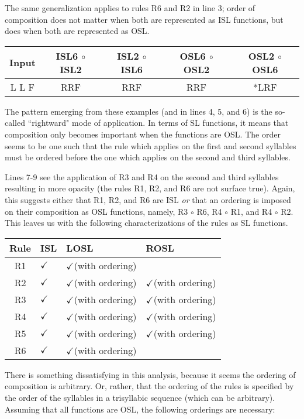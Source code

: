 \documentclass{article}
\newcommand{\Y}{$\checkmark$}
\newcommand{\N}{\ding{55}}
\begin{document}
 \par
The same generalization applies to rules R6 and R2 in line 3; order of composition does not matter when both are represented as ISL functions, but does when both are represented as OSL. 
\begin{exe}
\ex
\begin{tabular}[t]{|c|c|c||c|c|}
\hline
Input & ISL6 $\circ$ ISL2 & ISL2 $\circ$ ISL6 & OSL6 $\circ$ OSL2 & OSL2 $\circ$ OSL6  \\
\hline
L L F & RRF & RRF & RRF & *LRF   \\ 
\hline
\end{tabular}
\end{exe}
The pattern emerging from these examples (and in lines 4, 5, and 6) is the so-called ``rightward" mode of application. In terms of SL functions, it means that composition only becomes important when the functions are OSL. The order seems to be one such that the rule which applies on the first and second syllables must be ordered before the one which applies on the second and third syllables.
\par
Lines 7-9 see the application of R3 and R4 on the second and third syllables resulting in more opacity (the rules R1, R2, and R6 are not surface true). Again, this suggests either that R1, R2, and R6 are ISL \emph{or} that an ordering is imposed on their composition as OSL functions, namely, R3 $\circ$ R6, R4 $\circ$ R1, and R4 $\circ$ R2. This leaves us with the following characterizations of the rules as SL functions.
\begin{exe}
\ex
\begin{tabular}[t]{|c|l|l|l|}
\hline
Rule & ISL & LOSL & ROSL \\
\hline
R1 & \Y & \Y (with ordering) & \N \\
\hline
R2 & \Y & \Y (with ordering) & \Y (with ordering) \\
\hline
R3 & \Y & \Y (with ordering) & \Y (with ordering) \\
\hline
R4 & \Y & \Y (with ordering) & \Y (with ordering) \\
\hline
R5 & \Y & \Y (with ordering) & \Y (with ordering) \\
\hline
R6 & \Y & \Y (with ordering) & \N \\
\hline
\end{tabular}
\end{exe}
\par
There is something dissatisfying in this analysis, because it seems the ordering of composition is arbitrary. Or, rather, that the ordering of the rules is specified by the order of the syllables in a trisyllabic sequence (which can be arbitrary). Assuming that all functions are OSL, the following orderings are necessary: 
\end{document}
